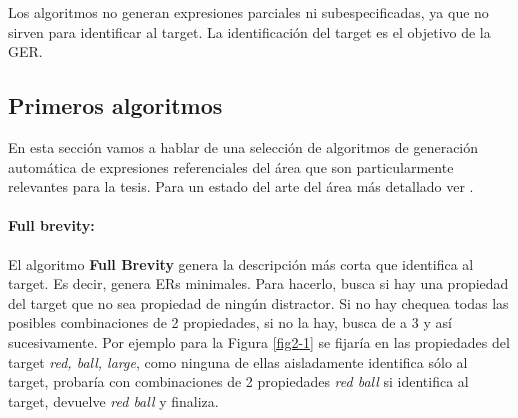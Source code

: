 Los algoritmos no generan expresiones parciales ni subespecificadas, ya que no sirven para identificar al target. La identificaci\'on del target es el objetivo de la GER.




\subsection{Primeros algoritmos}

En esta secci\'on vamos a hablar de una selecci\'on de algoritmos de generaci\'on autom\'atica de expresiones referenciales del \'area que son 
particularmente relevantes para la tesis. Para un estado del arte del \'area m\'as detallado ver \cite{survey}. 


 


\paragraph{Full brevity:} El algoritmo {\bf Full Brevity} \cite{Dale:1989:CUR:981623.981632} genera la descripci\'on m\'as corta que 
identifica al target. Es decir, genera ERs minimales. Para hacerlo, 
busca si hay una propiedad del target que no sea propiedad de ning\'un distractor. Si no hay chequea todas las posibles combinaciones 
de 2 propiedades, si no la hay, busca de a 3 y as\'i sucesivamente. Por ejemplo para la Figura \ref{fig2-1} se fijar\'ia en las propiedades 
del target {\it red, ball, large}, como ninguna de ellas aisladamente identifica s\'olo al target, probar\'ia con combinaciones de 2 propiedades {\it red ball} si identifica al target, devuelve {\it red ball} y finaliza.

